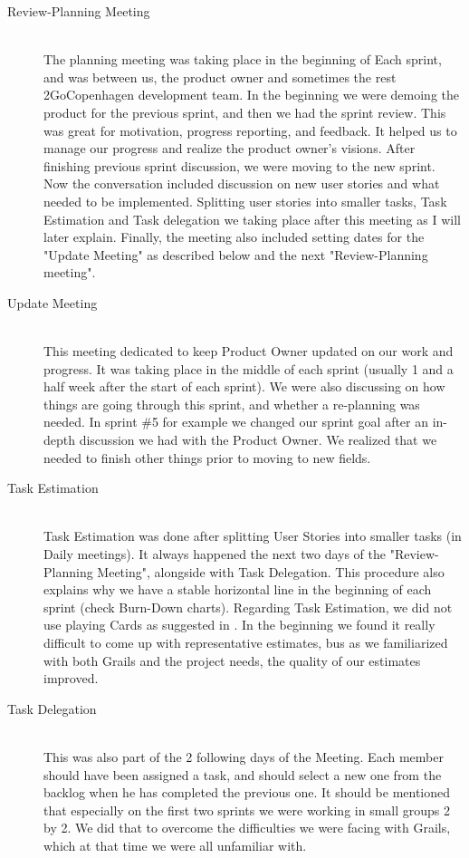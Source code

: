 \begin{description}
  \item[Review-Planning Meeting] \hfill \\
  The planning meeting was taking place in the beginning of Each sprint, and was between us, the product owner and sometimes the rest 2GoCopenhagen development team.
  In the beginning we were demoing the product for the previous sprint, and then we had the sprint review. This was great for motivation, progress reporting, and feedback. It helped us to manage our progress and realize the product owner’s visions. After finishing previous sprint discussion, we were moving to the new sprint. Now the conversation included discussion on new user stories and what needed to be implemented. Splitting user stories into smaller tasks, Task Estimation and Task delegation we taking place after this meeting as I will later explain. Finally, the meeting also included setting dates for the "Update Meeting" as described below and the next "Review-Planning meeting".
  
  \item[Update  Meeting] \hfill \\
  This meeting dedicated to keep Product Owner updated on our work and progress. It was taking place in the middle of each sprint (usually 1 and a half week after the start of each sprint). We were also discussing on how things are going through this sprint, and whether a re-planning was needed. In sprint \#5  for example we changed our sprint goal after an in-depth discussion we had with the Product Owner. We realized that we needed to finish other things prior to moving to new fields.
  
  \item[Task Estimation] \hfill \\
  Task Estimation was done after splitting User Stories into smaller tasks (in Daily meetings). It always happened the next two days of the "Review-Planning Meeting", alongside with Task Delegation. This procedure also explains why we have a stable horizontal line in the beginning of each sprint (check Burn-Down charts). Regarding Task Estimation, we did not use playing Cards as suggested in \cite{HenrikScrum}. In the beginning we found it really difficult to come up with representative estimates, bus as we familiarized with both Grails and the project needs, the quality of our estimates improved.
  
  \item[Task Delegation] \hfill \\
  This was also part of the 2 following days of the Meeting. Each member should have been assigned a task, and should select a new one from the backlog when he has completed the previous one. It should be mentioned that especially on the first two sprints we were working in small groups 2 by 2. We did that to overcome the difficulties we were facing with Grails, which at that time we were all unfamiliar with. 
  

\end{description}

